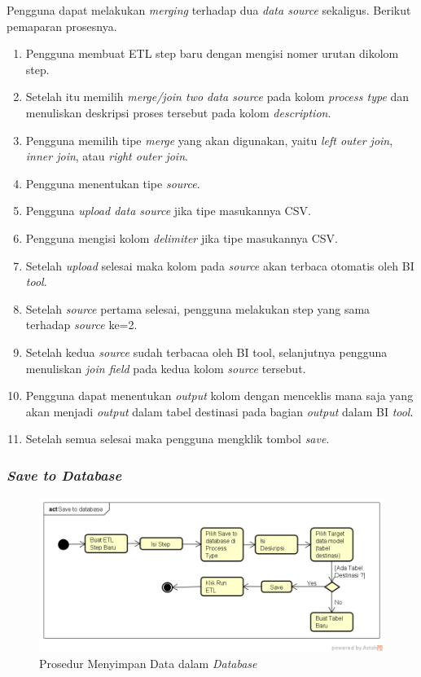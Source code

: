 	Pengguna dapat melakukan \textit{merging} terhadap dua \textit{data source} sekaligus. Berikut pemaparan prosesnya. 
	\begin{enumerate}
		\item Pengguna membuat ETL step baru dengan mengisi nomer urutan dikolom step.
		\item Setelah itu memilih \textit{merge/join two data source} pada kolom \textit{process type} dan menuliskan deskripsi proses tersebut pada kolom \textit{description}.
		\item Pengguna memilih tipe \textit{merge} yang akan digunakan, yaitu \textit{left outer join}, \textit{inner join}, atau \textit{right outer join}.
		\item Pengguna menentukan tipe \textit{source}.
		\item Pengguna \textit{upload data source} jika tipe masukannya CSV.
		\item Pengguna mengisi kolom \textit{delimiter} jika tipe masukannya CSV.
		\item Setelah \textit{upload} selesai maka kolom pada \textit{source} akan terbaca otomatis oleh BI \textit{tool}.
		\item Setelah \textit{source} pertama selesai, pengguna melakukan step yang sama terhadap \textit{source} ke=2.
		\item Setelah kedua \textit{source} sudah terbacaa oleh BI tool, selanjutnya pengguna menuliskan \textit{join field} pada kedua kolom \textit{source} tersebut.
		\item Pengguna dapat menentukan \textit{output} kolom dengan menceklis mana saja yang akan menjadi \textit{output} dalam tabel destinasi pada bagian \textit{output} dalam BI \textit{tool}.
		\item Setelah semua selesai maka pengguna mengklik tombol \textit{save}.
	\end{enumerate}
	
	\subsubsection{\textit{Save to Database}}
	
	\begin{figure}[H]
	\centering
	\includegraphics[scale=0.5]{Gambar/Save-to-database}
	\caption{Prosedur Menyimpan Data dalam \textit{Database}}
	\end{figure}
	
